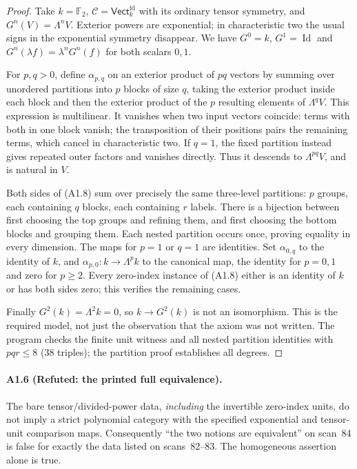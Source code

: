 \begin{proof}
Take $k=\mathbb F_2$, $\mathcal C=\mathsf{Vect}^{\mathrm{fd}}_k$ with
its ordinary tensor symmetry, and $G^n(V)=\Lambda^nV$. Exterior powers
are exponential; in characteristic two the usual signs in the
exponential symmetry disappear. We have $G^0=k$, $G^1=\operatorname{Id}$
and $G^n(\lambda f)=\lambda^nG^n(f)$ for both scalars $0,1$.

For $p,q>0$, define $\alpha_{p,q}$ on an exterior product of $pq$
vectors by summing over unordered partitions into $p$ blocks of size
$q$, taking the exterior product inside each block and then the exterior
product of the $p$ resulting elements of $\Lambda^qV$. This expression
is multilinear. It vanishes when two input vectors coincide: terms with
both in one block vanish; the transposition of their positions pairs
the remaining terms, which cancel in characteristic two. If $q=1$, the
fixed partition instead gives repeated outer factors and vanishes
directly. Thus it descends to $\Lambda^{pq}V$, and is natural in $V$.

Both sides of (A1.8) sum over precisely the same three-level partitions:
$p$ groups, each containing $q$ blocks, each containing $r$ labels.
There is a bijection between first choosing the top groups and refining
them, and first choosing the bottom blocks and grouping them. Each
nested partition occurs once, proving equality in every dimension.
The maps for $p=1$ or $q=1$ are identities. Set $\alpha_{0,q}$ to the
identity of $k$, and $\alpha_{p,0}:k\to\Lambda^p k$ to the canonical
map, the identity for $p=0,1$ and zero for $p\geq2$. Every zero-index
instance of (A1.8) either is an identity of $k$ or has both sides zero;
this verifies the remaining cases.

Finally $G^2(k)=\Lambda^2k=0$, so $k\to G^2(k)$ is not an
isomorphism. This is the required model, not just the observation that
the axiom was not written. The program checks the finite unit witness
and all nested partition identities with $pqr\leq8$ (38 triples);
the partition proof establishes all degrees.
\end{proof}

\paragraph{A1.6 (Refuted: the printed full equivalence).}
The bare tensor/divided-power data, \emph{including} the invertible
zero-index units, do not imply a strict polynomial category with the
specified exponential and tensor-unit comparison maps. Consequently
``the two notions are equivalent'' on scan~84 is false for exactly the
data listed on scans~82--83. The homogeneous assertion alone is true.

